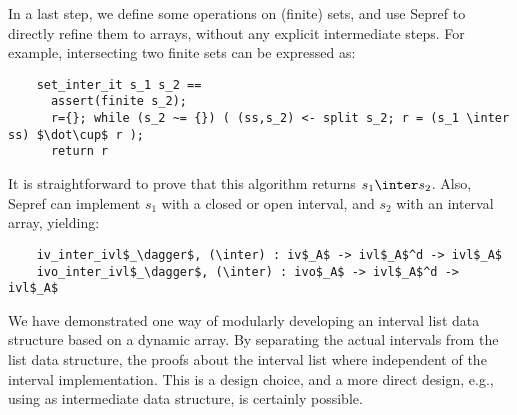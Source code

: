 \documentclass[sn-mathphys,Numbered]{sn-jnl}
\theoremstyle{thmstyleone}%
\theoremstyle{definition}%
\theoremstyle{thmstylethree}%
\begin{document}
  In a last step, we define some operations on (finite) sets, and use Sepref to directly refine them to arrays, without any explicit intermediate steps.
  For example, intersecting two finite sets can be expressed as:
  \begin{lstlisting}
    set_inter_it s_1 s_2 ==
      assert(finite s_2);
      r={}; while (s_2 ~= {}) ( (ss,s_2) <- split s_2; r = (s_1 \inter ss) $\dot\cup$ r );
      return r
  \end{lstlisting}
  It is straightforward to prove that this algorithm returns \is$s_1 \inter s_2$.
  Also, Sepref can implement $s_1$ with a closed or open interval, and $s_2$ with an interval array, yielding:
  \begin{lstlisting}
    iv_inter_ivl$_\dagger$, (\inter) : iv$_A$ -> ivl$_A$^d -> ivl$_A$
    ivo_inter_ivl$_\dagger$, (\inter) : ivo$_A$ -> ivl$_A$^d -> ivl$_A$
  \end{lstlisting}

  We have demonstrated one way of modularly developing an interval list data structure based on a dynamic array.
  By separating the actual intervals from the list data structure, the proofs about the interval
  list where independent of the interval implementation.
  This is a design choice, and a more direct design, e.g., using  as intermediate data structure, is certainly possible.
\end{document}
